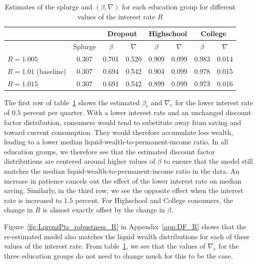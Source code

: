 \documentclass[../HAFiscal]{subfiles}
\begin{document}
\begin{table}[t]
\begin{center}
	\begin{tabular}{lc|cccccc} 
		\toprule
		& & \multicolumn{2}{c}{Dropout} & \multicolumn{2}{c}{Highschool} & \multicolumn{2}{c}{College} \\ \midrule 
		& Splurge & $\beta$ & $\nabla$ & $\beta$ & $\nabla$ & $\beta$ & $\nabla$ \\ \midrule 
		$R = 1.005$ & 0.307 & 0.701 & 0.520 & 0.909 & 0.099 & 0.983 & 0.014 \\
		$R = 1.01$ (baseline) & 0.307 & 0.694 & 0.542 & 0.904 & 0.099 & 0.978 & 0.015 \\ 
		$R = 1.015$ & 0.307 & 0.691 & 0.542 & 0.899 & 0.099 & 0.973 & 0.016 
		\\ \bottomrule 
	\end{tabular}
\caption{Estimates of the splurge and $(\beta,\nabla)$ for each education group for different values of the interest rate $R$}
\label{tab:robustness_R}
\end{center}
\end{table}

The first row of table~\ref{tab:robustness_R} shows the estimated $\beta_e$ and $\nabla_e$ for the lower interest rate of $0.5$ percent per quarter. With a lower interest rate and an unchanged discount factor distribution, consumers would tend to substitute away from saving and toward current consumption. They would therefore accumulate less wealth, leading to a lower median liquid-wealth-to-permanent-income ratio. In all education groups, we therefore see that the estimated discount factor distributions are centered around higher values of $\beta$ to ensure that the model still matches the median liquid-wealth-to-permanent-income ratio in the data. An increase in patience cancels out the effect of the lower interest rate on median saving. Similarly, in the third row, we see the opposite effect when the interest rate is increased to $1.5$ percent. For Highschool and College consumers, the change in $R$ is almost exactly offset by the change in $\beta$.  

Figure~\ref{fig:LorenzPts_robustness_R} in Appendix~\ref{app:DF_R} shows that the re-estimated model also matches the liquid wealth distributions for each of these values of the interest rate. From table~\ref{tab:robustness_R}, we see that the values of $\nabla_e$ for the three education groups do not need to change much for this to be the case. 

\FloatBarrier
\end{document}
